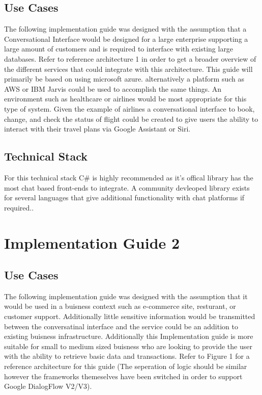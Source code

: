 \documentclass[9pt,software]{livecoms}
\begin{document}
\subsection{Use Cases}
The following implementation guide was designed with the assumption that a Conversational Interface would be designed for a large enterprise supporting
a large amount of customers and is required to interface with existing large databases. Refer to reference architecture 1 in order to get a broader overview
of the different services that could integrate with this architecture. This guide will primarily be based on using microsoft azure. alternatively a platform
such as AWS or IBM Jarvis could be used to accomplish the same things. An environment such as healthcare or airlines would be most appropriate for this type
of system. Given the example of airlines a conversational interface to book, change, and check the status of flight could be created to give users the ability
to interact with their travel plans via Google Assistant or Siri.

\subsection{Technical Stack}
For this technical stack C# is highly recommended as it's offical library has the most chat based front-ends to integrate. A community devleoped library exists
for several languages that give additional functionality with chat platforms if required..

\section{Implementation Guide 2}

\subsection{Use Cases}
The following implementation guide was designed with the assumption that it would be used in a buisness context such as 
e-commerce site, resturant, or customer support. Additionally little sensitive information would be transmitted between the 
conversatinal interface and the service could be an addition to existing buisness infrastructure. Additionally this 
Implementation guide is more suitable for small to medium sized buisness who are looking to provide the user with 
the ability to retrieve basic data and transactions. Refer to Figure 1 for a reference architecture for this guide (The seperation of logic
should be similar however the frameworks themeselves have been switched in order to support Google DialogFlow V2/V3).
\end{document}
